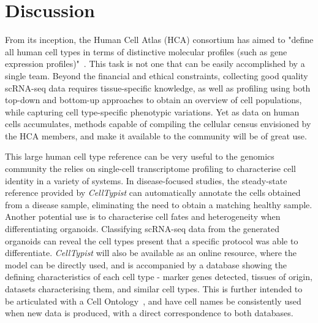 \section{Discussion}
\label{section4.3}
From its inception, the Human Cell Atlas (HCA) consortium has aimed to "define all human cell types in terms of distinctive molecular profiles (such as gene expression profiles)"~\citep{regev_human_2017}. This task is not one that can be easily accomplished by a single team. Beyond the financial and ethical constraints, collecting good quality scRNA-seq data requires tissue-specific knowledge, as well as profiling using both top-down and bottom-up approaches to obtain an overview of cell populations, while capturing cell type-specific phenotypic variations. Yet as data on human cells accumulates, methods capable of compiling the cellular census envisioned by the HCA members, and make it available to the community will be of great use.



This large human cell type reference can be very useful to the genomics community the relies on single-cell transcriptome profiling to characterise cell identity in a variety of systems. In disease-focused studies, the steady-state reference provided by \textit{CellTypist} can automatically annotate the cells obtained from a disease sample, eliminating the need to obtain a matching healthy sample. Another potential use is to characterise cell fates and heterogeneity when differentiating organoids. Classifying scRNA-seq data from the generated organoids can reveal the cell types present that a specific protocol was able to differentiate. \textit{CellTypist} will also be available as an online resource, where the model can be directly used, and is accompanied by a database showing the defining characteristics of each cell type - marker genes detected, tissues of origin, datasets characterising them, and similar cell types. This is further intended to be articulated with a Cell Ontology~\citep{bard_ontology_2005}, and have cell names be consistently used when new data is produced, with a direct correspondence to both databases.



